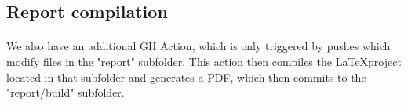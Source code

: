 \subsection{Report compilation}
\paragraph{} We also have an additional GH Action, which is only triggered by pushes which modify files in the "report" subfolder. This action then compiles the \LaTeX project located in that subfolder and generates a PDF, which then commits to the "report/build" subfolder.